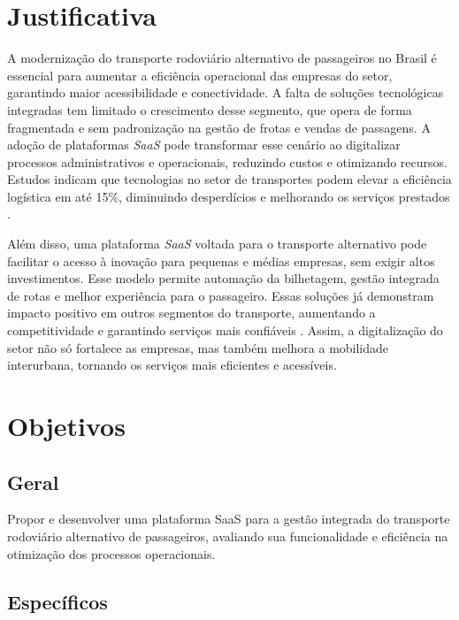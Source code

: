 \section{Justificativa}

A modernização do transporte rodoviário alternativo de passageiros no Brasil é essencial para aumentar a eficiência operacional das empresas do setor, garantindo maior acessibilidade e conectividade. A falta de soluções tecnológicas integradas tem limitado o crescimento desse segmento, que opera de forma fragmentada e sem padronização na gestão de frotas e vendas de passagens. A adoção de plataformas \textit{SaaS} pode transformar esse cenário ao digitalizar processos administrativos e operacionais, reduzindo custos e otimizando recursos. Estudos indicam que tecnologias no setor de transportes podem elevar a eficiência logística em até 15\%, diminuindo desperdícios e melhorando os serviços prestados \cite{setcepar2023}.

Além disso, uma plataforma \textit{SaaS} voltada para o transporte alternativo pode facilitar o acesso à inovação para pequenas e médias empresas, sem exigir altos investimentos. Esse modelo permite automação da bilhetagem, gestão integrada de rotas e melhor experiência para o passageiro. Essas soluções já demonstram impacto positivo em outros segmentos do transporte, aumentando a competitividade e garantindo serviços mais confiáveis \cite{prologapp2024}. Assim, a digitalização do setor não só fortalece as empresas, mas também melhora a mobilidade interurbana, tornando os serviços mais eficientes e acessíveis.


\section{Objetivos}

\subsection{Geral}

Propor e desenvolver uma plataforma SaaS para a gestão integrada do transporte rodoviário alternativo de passageiros, avaliando sua funcionalidade e eficiência na otimização dos processos operacionais.

\subsection{Específicos}

